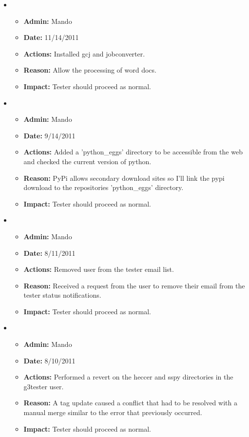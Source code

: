 \documentclass[12pt]{article}
\begin{document}
\begin{itemize}
\item
  \begin{itemize}
  \item[] {\bf Admin:} Mando
  \item[] {\bf Date:} 11/14/2011
  \item[] {\bf Actions:} Installed gcj and jobconverter.
  \item[] {\bf Reason:} Allow the processing of word docs.
  \item[] {\bf Impact:} Tester should proceed as normal.
  \end{itemize}
  
\item
  \begin{itemize}
  \item[] {\bf Admin:} Mando
  \item[] {\bf Date:} 9/14/2011
  \item[] {\bf Actions:} Added a 'python\_eggs' directory to be accessible from the web and checked the current version of python.
  \item[] {\bf Reason:} PyPi allows secondary download sites so I'll link the pypi download to the repositories 'python\_eggs' directory.
  \item[] {\bf Impact:} Tester should proceed as normal.
  \end{itemize}
  
\item
  \begin{itemize}
  \item[] {\bf Admin:} Mando
  \item[] {\bf Date:} 8/11/2011
  \item[] {\bf Actions:} Removed user from the tester email list. 
  \item[] {\bf Reason:} Received a request from the user to remove their email from the tester status notifications.
  \item[] {\bf Impact:} Tester should proceed as normal.
  \end{itemize}
  
\item
  \begin{itemize}
  \item[] {\bf Admin:} Mando
  \item[] {\bf Date:} 8/10/2011
  \item[] {\bf Actions:} Performed a revert on the heccer and sspy directories in the g3tester user. 
  \item[] {\bf Reason:} A tag update caused a conflict that had to be resolved with a manual merge similar to the error that previously occurred.
  \item[] {\bf Impact:} Tester should proceed as normal.
  \end{itemize}
  

\end{itemize}
\end{document}
